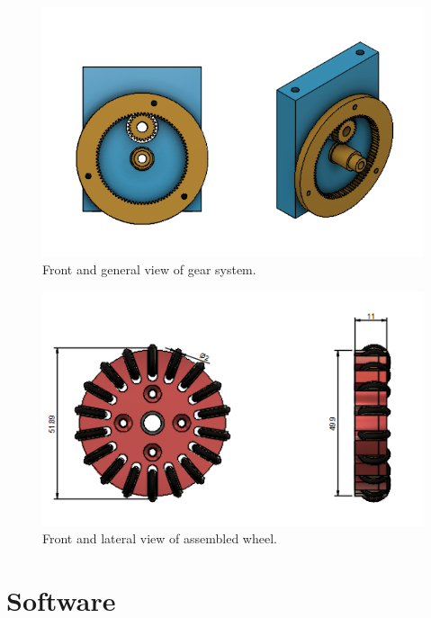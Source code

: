 \documentclass{llncs}
\begin{document}
\begin{figure}[H]
    \centering
    \includegraphics[scale=0.6]{Images/Engranaje.jpeg}
    \caption{Front and general view of gear system. }
    \label{fig:Wheel1}
\end{figure}

\begin{figure}[H]
    \centering
    \includegraphics[scale=0.6]{Images/Wheel.jpeg}
    \caption{Front and lateral view of assembled wheel. }
    \label{fig:Wheel2}
\end{figure}

\section{Software}
\end{document}
